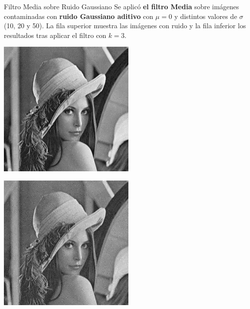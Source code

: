 \documentclass{beamer}
\begin{document}
\begin{frame}[fragile]{Filtro Media sobre Ruido Gaussiano}
	\justifying
	\footnotesize
	Se aplicó \textcolor{unahurverde}{\textbf{el filtro Media}} sobre imágenes contaminadas con \textcolor{unahurverde}{\textbf{ruido Gaussiano aditivo}}  
	con $\mu = 0$ y distintos valores de $\sigma$ (10, 20 y 50).  
	La fila superior muestra las imágenes con ruido y la fila inferior los resultados tras aplicar el filtro con $k=3$.
	
	\centering
	\begin{minipage}{0.25\linewidth}
		\centering
		\includegraphics[width=\linewidth]{../results/lena_gauss_sigma10}
	\end{minipage}\hfill
	\begin{minipage}{0.25\linewidth}
		\centering
		\includegraphics[width=\linewidth]{../results/lena_gauss_sigma20}

\end{minipage}
\end{frame}
\end{document}

